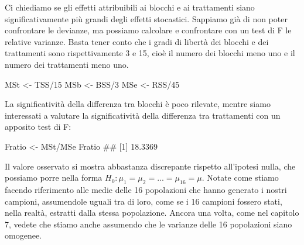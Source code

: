 \documentclass[a4paper,12pt,oneside]{book}
\newenvironment{Shaded}{\begin{snugshade}}{\end{snugshade}}
\newcommand{\DecValTok}[1]{#1}
\newcommand{\SpecialCharTok}[1]{#1}
\newcommand{\DocumentationTok}[1]{#1}
\newcommand{\OtherTok}[1]{#1}
\newcommand{\FunctionTok}[1]{#1}
\newcommand{\NormalTok}[1]{#1}
\begin{document}
\begin{Shaded}
\end{Shaded}

Ci chiediamo se gli effetti attribuibili ai blocchi e ai trattamenti siano significativamente più grandi degli effetti stocastici. Sappiamo già di non poter confrontare le devianze, ma possiamo calcolare e confrontare con un test di F le relative varianze. Basta tener conto che i gradi di libertà dei blocchi e dei trattamenti sono rispettivamente 3 e 15, cioè il numero dei blocchi meno uno e il numero dei trattamenti meno uno.

\begin{Shaded}
\begin{Highlighting}[]
\NormalTok{MSt }\OtherTok{\textless{}{-}}\NormalTok{ TSS}\SpecialCharTok{/}\DecValTok{15}
\NormalTok{MSb }\OtherTok{\textless{}{-}}\NormalTok{ BSS}\SpecialCharTok{/}\DecValTok{3}
\NormalTok{MSe }\OtherTok{\textless{}{-}}\NormalTok{ RSS}\SpecialCharTok{/}\DecValTok{45}
\end{Highlighting}
\end{Shaded}

La significatività della differenza tra blocchi è poco rilevate, mentre siamo interessati a valutare la significatività della differenza tra trattamenti con un apposito test di F:

\begin{Shaded}
\begin{Highlighting}[]
\NormalTok{Fratio }\OtherTok{\textless{}{-}}\NormalTok{ MSt}\SpecialCharTok{/}\NormalTok{MSe}
\NormalTok{Fratio}
\DocumentationTok{\#\# [1] 18.3369}
\end{Highlighting}
\end{Shaded}

Il valore osservato si mostra abbastanza discrepante rispetto all'ipotesi nulla, che possiamo porre nella forma \(H_0: \mu_1 = \mu_2 = ... = \mu_{16} = \mu\). Notate come stiamo facendo riferimento alle medie delle 16 popolazioni che hanno generato i nostri campioni, assumendole uguali tra di loro, come se i 16 campioni fossero stati, nella realtà, estratti dalla stessa popolazione. Ancora una volta, come nel capitolo 7, vedete che stiamo anche assumendo che le varianze delle 16 popolazioni siano omogenee.
\end{document}
